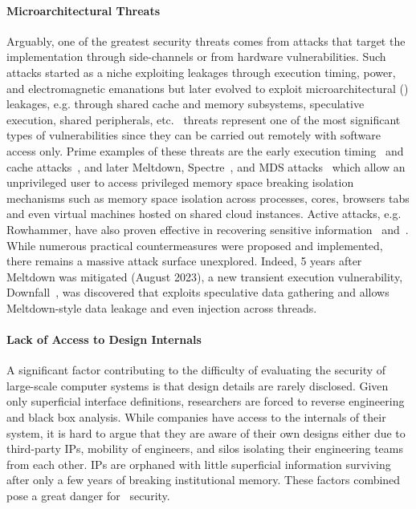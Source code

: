 \paragraph{Microarchitectural Threats}
Arguably, one of the greatest security threats comes from attacks that target the implementation through side-channels or from hardware vulnerabilities. Such attacks started as a niche exploiting leakages through execution timing, power, and electromagnetic emanations but later evolved to exploit microarchitectural (\Mi ) leakages, e.g. through shared cache and memory subsystems, speculative execution, shared peripherals, etc. \Mi\ threats represent one of the most significant types of vulnerabilities since they can be carried out remotely with software access only. Prime examples of these threats are the early execution timing~\cite{kocher1996timing} and cache attacks~\cite{yarom2014flush+, liu2015last,liu2015last}, and later Meltdown, Spectre~\cite{kocher2019spectre}, and MDS attacks~\cite{moghimi2020medusa,canella2019fallout,vanbulck2020lvi}  which allow an unprivileged user to access privileged memory space breaking isolation mechanisms such as memory space isolation across processes, cores, browsers tabs and even virtual machines hosted on shared cloud instances. Active attacks, e.g. Rowhammer, have also proven effective in recovering sensitive information~\cite{kwong2020rambleed} and~\cite{mus2023jolt,adiletta2023mayhem}. While numerous practical countermeasures were proposed and implemented, there remains a massive attack surface unexplored. Indeed, 5 years after Meltdown was mitigated (August 2023), a new transient execution vulnerability, Downfall~\cite{moghimi2023downfall}, was discovered that exploits speculative data gathering and allows Meltdown-style data leakage and even injection across threads. 

\paragraph{Lack of Access to Design Internals}
A significant factor contributing to the difficulty of evaluating the security of large-scale computer systems is that design details are rarely disclosed. Given only superficial interface definitions, researchers are forced to reverse engineering and black box analysis. While companies have access to the internals of their system, it is hard to argue that they are aware of their own designs either due to third-party IPs, mobility of engineers, and silos isolating their engineering teams from each other. IPs are orphaned with little superficial information surviving after only a few years of breaking institutional memory. These factors combined pose a great danger for \Mi\ security. 

